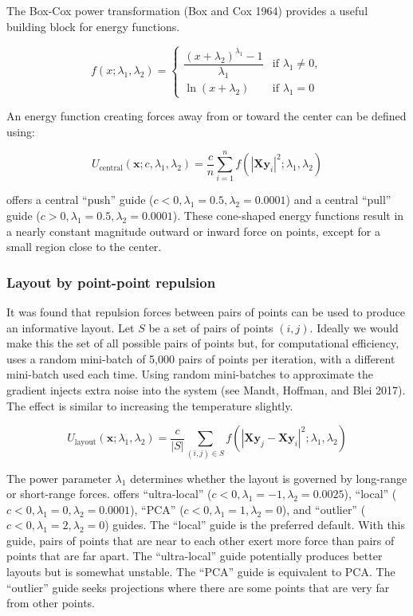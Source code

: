 The Box-Cox power transformation (Box and Cox 1964) provides a useful building block for energy functions.

\[
f(x ; \lambda_1 , \lambda_2) = 
\begin{cases}
 \dfrac{(x + \lambda_2)^{\lambda_1} - 1}{\lambda_1} & \text{if } \lambda_1 \neq 0, \\
 \ln (x + \lambda_2) & \text{if } \lambda_1 = 0
\end{cases}
\]

An energy function creating forces away from or toward the center can be defined using:

\[
U_\text{central}(\mathbf x ; c,\lambda_1,\lambda_2) = \frac{c}{n} \sum_{i=1}^n f\left(|\mathbf X \mathbf y_{i}|^2 ; \lambda_1,\lambda_2\right)
\]

 offers a central ``push'' guide (\(c<0,\lambda_1=0.5,\lambda_2=0.0001\)) and a central ``pull'' guide (\(c>0,\lambda_1=0.5,\lambda_2=0.0001\)). These cone-shaped energy functions result in a nearly constant magnitude outward or inward force on points, except for a small region close to the center.

\hypertarget{layout-by-point-point-repulsion}{%
\subsubsection{Layout by point-point repulsion}\label{layout-by-point-point-repulsion}}

It was found that repulsion forces between pairs of points can be used to produce an informative layout. Let \(S\) be a set of pairs of points \((i,j)\). Ideally we would make this the set of all possible pairs of points but, for computational efficiency,  uses a random mini-batch of 5,000 pairs of points per iteration, with a different mini-batch used each time. Using random mini-batches to approximate the gradient injects extra noise into the system (see Mandt, Hoffman, and Blei 2017). The effect is similar to increasing the temperature slightly.

\[
U_\text{layout}(\mathbf x ; \lambda_1,\lambda_2) = 
    \frac{c}{|S|} \sum_{(i,j) \in S} f\left(|\mathbf X \mathbf y_{j}-\mathbf X \mathbf y_{i}|^2; \lambda_1,\lambda_2\right)
\]

The power parameter \(\lambda_1\) determines whether the layout is governed by long-range or short-range forces.  offers ``ultra-local'' (\(c<0,\lambda_1=-1,\lambda_2=0.0025\)), ``local'' (\(c<0,\lambda_1=0,\lambda_2=0.0001\)), ``PCA'' (\(c<0,\lambda_1=1,\lambda_2=0\)), and ``outlier'' (\(c<0,\lambda_1=2,\lambda_2=0\)) guides. The ``local'' guide is the preferred default. With this guide, pairs of points that are near to each other exert more force than pairs of points that are far apart. The ``ultra-local'' guide potentially produces better layouts but is somewhat unstable. The ``PCA'' guide is equivalent to PCA. The ``outlier'' guide seeks projections where there are some points that are very far from other points.

